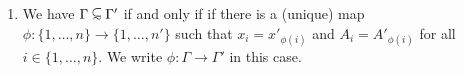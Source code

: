\begin{definition}
\begin{enumerate}
\item
\label{definition-context-lambda-08}
We have $\Gamma \subseteqsim \Gamma'$ if and only if
if there is a (unique) map $\phi:\{1,\ldots,n\} \rightarrow \{1,\ldots,n'\}$
such that $x_{i}=x'_{\phi(i)}$ and $A_{i}=A'_{\phi(i)}$ for all $i \in \{1,\ldots,n\}$. We write $\phi:\Gamma \rightarrow \Gamma'$ in this case.

\end{enumerate}
\end{definition}








%
%
%
%
%



